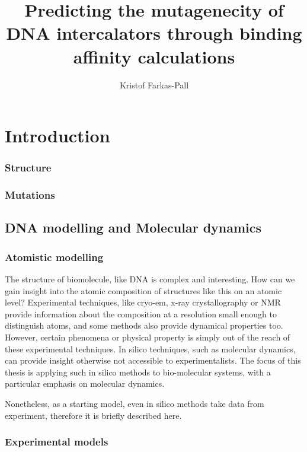 \documentclass{report}
\title{Predicting the mutagenecity of DNA intercalators through binding affinity calculations}
\author{Kristof Farkas-Pall}
\begin{document}
\maketitle

\tableofcontents

\chapter{Introduction}



\subsection{Structure}

\subsection{Mutations}

\section{DNA modelling and Molecular dynamics}

\subsection{Atomistic modelling}

The structure of biomolecule, like DNA is complex and interesting. How can we gain insight into the atomic composition of structures like this on an atomic level? Experimental techniques, like cryo-em, x-ray crystallography or NMR provide information about the composition at a resolution small enough to distinguish atoms, and some methods also provide dynamical properties too. However, certain phenomena or physical property is simply out of the reach of these experimental techniques. In silico techniques, such as molecular dynamics, can provide insight otherwise not accessible to experimentalists. The focus of this thesis is applying such in silico methods to bio-molecular systems, with a particular emphasis on molecular dynamics. 

Nonetheless, as a starting model, even in silico methods take data from experiment, therefore it is briefly described here.

\subsection{Experimental models}
\end{document}
